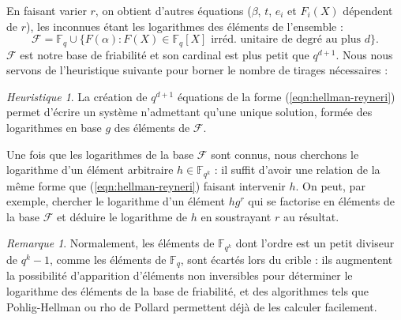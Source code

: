 \documentclass[a4paper, titlepage, 11pt]{article}
\theoremstyle{definition}
\theoremstyle{remark}
\newtheorem{rema}[theo]{Remarque}
\newtheorem{heur}[theo]{Heuristique}
\def\gf #1{\mathbb{F}_{#1}}
\begin{document}
En faisant varier $r$, on obtient d'autres équations ($\beta$, $t$, $e_i$ et $F_i(X)$ dépendent de $r$), les inconnues étant les logarithmes des éléments de l'ensemble :
$$\mathcal{F} =  \gf{q} \cup \{F(\alpha) : F(X) \in \gf{q}[X] \text{ irréd. unitaire de degré au plus } d \}.$$
$\mathcal{F}$ est notre base de friabilité et son cardinal est plus petit que $q^{d+1}$. Nous nous servons de l'heuristique suivante pour borner le nombre de tirages nécessaires :
\begin{heur}
La création de $q^{d+1}$ équations de la forme (\ref{eqn:hellman-reyneri}) permet d'écrire un système n'admettant qu'une unique solution, formée des logarithmes en base $g$ des éléments de $\mathcal{F}$.
\end{heur}

Une fois que les logarithmes de la base $\mathcal{F}$ sont connus, nous cherchons le logarithme d'un élément arbitraire $h \in \gf{q^k}$ : il suffit d'avoir une relation de la même forme que (\ref{eqn:hellman-reyneri}) faisant intervenir $h$. On peut, par exemple, chercher le logarithme d'un élément $hg^r$ qui se factorise en éléments de la base $\mathcal{F}$ et déduire le logarithme de $h$ en soustrayant $r$ au résultat.

\begin{rema}
Normalement, les éléments de $\gf{q^k}$ dont l'ordre est un petit diviseur de $q^k-1$, comme les éléments de $\gf{q}$, sont écartés lors du crible : ils augmentent la possibilité d'apparition d'éléments non inversibles pour déterminer le logarithme des éléments de la base de friabilité, et des algorithmes tels que Pohlig-Hellman \cite{pohligHellman1978} ou rho de Pollard \cite{pollard1978} permettent déjà de les calculer facilement.
\end{rema}
\end{document}
